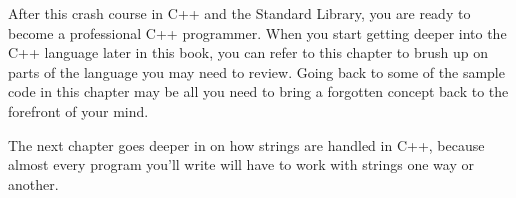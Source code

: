 After this crash course in C++ and the Standard Library, you are ready to become a professional C++ programmer. When you start getting deeper into the C++ language later in this book, you can refer to this chapter to brush up on parts of the language you may need to review. Going back to some of the sample code in this chapter may be all you need to bring a forgotten concept back to the forefront of your mind.

The next chapter goes deeper in on how strings are handled in C++, because almost every program you’ll write will have to work with strings one way or another.